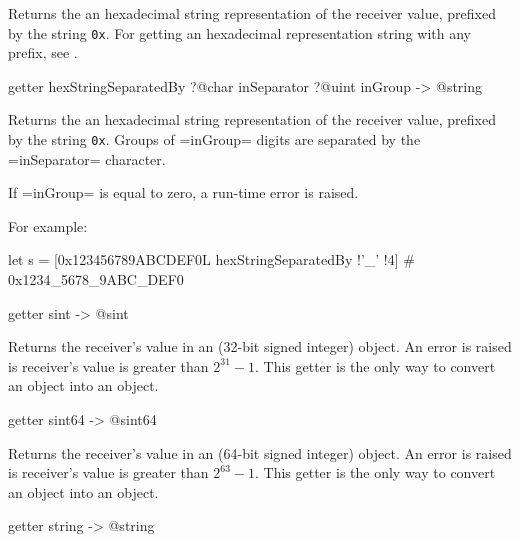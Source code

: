 Returns the an hexadecimal string representation of the receiver value, prefixed by the string \texttt{0x}. For getting an hexadecimal representation string with any prefix, see .







\begin{galgas3}
getter hexStringSeparatedBy ?@char inSeparator ?@uint inGroup -> @string
\end{galgas3}

Returns the an hexadecimal string representation of the receiver value, prefixed by the string \texttt{0x}. Groups of \ggst=inGroup= digits are separated by the \ggst=inSeparator= character.

If \ggst=inGroup= is equal to zero, a run-time error is raised.

For example:
\begin{galgas3}
let s = [0x123456789ABCDEF0L hexStringSeparatedBy !'_' !4] # 0x1234_5678_9ABC_DEF0
\end{galgas3}






\begin{galgas3}
getter sint -> @sint
\end{galgas3}

Returns the receiver's value in an  (32-bit signed integer) object. An error is raised is receiver's value is greater than $2^{31}-1$. This getter is the only way to convert an  object into an  object.




\begin{galgas3}
getter sint64 -> @sint64
\end{galgas3}

Returns the receiver's value in an  (64-bit signed integer) object. An error is raised is receiver's value is greater than $2^{63}-1$. This getter is the only way to convert an  object into an  object.



\begin{galgas3}
getter string -> @string
\end{galgas3}

